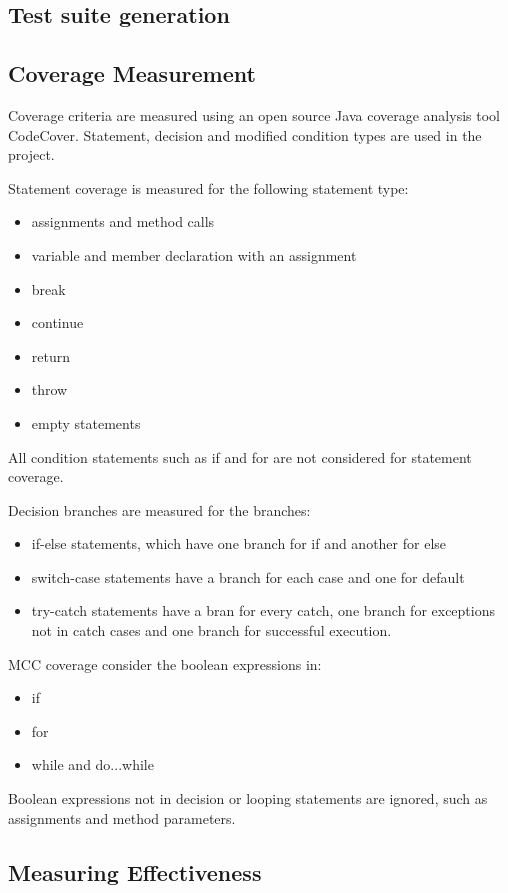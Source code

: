 \subsection{Test suite generation}

\subsection{Coverage Measurement}
Coverage criteria are measured using an open source Java coverage analysis tool CodeCover. Statement, decision and modified condition types are used in the project.

Statement coverage is measured for the following statement type:
\begin{itemize}
	\item assignments and method calls
	\item variable and member declaration with an assignment
	\item break
	\item continue
	\item return
	\item throw
	\item empty statements
\end{itemize}

All condition statements such as if and for are not considered for statement coverage.

Decision branches are measured for the branches:
	\begin{itemize}
		\item if-else statements, which have one branch for if and another for else
		\item switch-case statements have a branch for each case and one for default
		\item try-catch statements have a bran for every catch, one branch for exceptions not in catch cases and one branch for successful execution.
	\end{itemize}

MCC coverage consider the boolean expressions in:
	\begin{itemize}
		\item if
		\item for
		\item while and do...while
	\end{itemize}
Boolean expressions not in decision or looping statements are ignored, such as assignments and method parameters.
\subsection{Measuring Effectiveness}